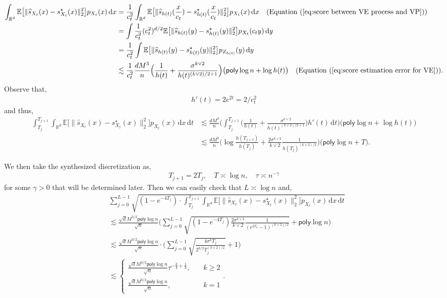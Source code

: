 \documentclass{article}
\newcommand{\diff}{\,\mathrm{d}}
\newcommand{\polylog}{\mathsf{poly}\log}
\theoremstyle{plain}
\theoremstyle{remark}
\begin{document}
\begin{align*}
    \int_{\mathbb{R}^d}\mathbb{E}\big[ \| \widehat{s}_{X_t}(x)-s^\star_{X_t}(x)\|_2^2\big] p_{X_t}(x)\diff x &= \frac{1}{c_t^2}\int_{\mathbb{R}^d}\mathbb{E}\big[ \| \widehat{s}_{h(t)}(\frac{x}{c_t})-s^\star_{h(t)}(\frac{x}{c_t})\|_2^2\big] p_{X_t}(x)\diff x \quad (\text{Equation (\ref{eq:score between VE process and VP})})\\ 
    &= \int \frac{1}{c_t^2}(c_t^2)^{d/2}\mathbb{E} \big[\| \widehat{s}_{h(t)}(y)-s^\star_{h(t)}(y)\|_2^2\big] p_{X_t}(c_t y)\diff y \\
    &= \frac{1}{c_t^2} \int \mathbb{E} \big[\| \widehat{s}_{h(t)}(y)-s^\star_{h(t)}(y)\|_2^2\big] p_{Z_{h(t)}}(y)\diff y \\
    &\lesssim \frac{1}{c_t^2} \frac{dM^3}{n} \Big( \frac{1}{h(t)}+\frac{\sigma^{k\vee2}}{h(t)^{{(k\vee2)}/2+1}}\Big) \big(\polylog n+\log h(t)\big)\quad (\text{Equation (\ref{eq:score estimation error for VE})}).
\end{align*}
Observe that, 
\begin{align*}
    h'(t) = 2e^{2t} = 2/c_t^2
\end{align*}
and thus, 
\begin{align*}
    \int_{T_j}^{T_{j+1}} \int_{\mathbb{R}^d}\mathbb{E}\big[ \| \widehat{s}_{X_t}(x)-s^\star_{X_t}(x)\|_2^2\big] p_{X_t}(x)\diff x \diff t &\lesssim \frac{dM^3}{n}\Big(\int_{T_j}^{T_{j+1}} \Big( \frac{1}{h(t)}+\frac{\sigma^{k\vee2}}{h(t)^{(k\vee2)/2+1}} \Big) h'(t) \diff t\Big) \big(\polylog n+\log h(t)\big)\\
    &\lesssim \frac{dM^3}{n} \Big( \log \frac{h(T_{j+1})}{h(T_j)} + \frac{2\sigma^{k\vee2}}{k\vee2}\frac{1}{h(T_j)^{(k\vee2)/2}} \Big) \big(\polylog n+T\big) .
\end{align*}

We then take the synthesized discretization as, 
\begin{align*}
    T_{j+1} = 2T_j, \quad T \asymp \log n, \quad \tau\asymp n^{-\gamma} 
\end{align*}
for some $\gamma>0$ that will be determined later. Then we can easily check that $L\asymp \log n$ and,
\begin{align*}
    &\sum_{j=0}^{L-1} \sqrt{(1-e^{-4T_j})\cdot \int_{T_j}^{T_{j+1}} \int_{\mathbb{R}^d}\mathbb{E}\big[ \| \widehat{s}_{X_t}(x)-s^\star_{X_t}(x)\|_2^2\big] p_{X_t}(x) \diff x \diff t} \\
    &\lesssim \frac{\sqrt{d}M^{3/2} \polylog n}{\sqrt{n}}  \Big( \sum_{j=0}^{L-1} \sqrt{(1-e^{-4T_j})\frac{2\sigma^{k\vee2}}{k\vee2}\frac{1}{(e^{2T_k}-1)^{(k\vee2)/2}}} + \polylog n\Big)\\
    &\lesssim \frac{\sqrt{d}M^{3/2}\polylog n}{\sqrt{n}} \cdot \Big(\sum_{j=0}^{L-1}\sqrt{\frac{4\sigma^kT_j}{2^{k/2}T_j^{(k\vee2)/2}}} +1 \Big) \\
    &\lesssim 
    \begin{cases}
        \frac{\sqrt{d}M^{3/2}\polylog n}{\sqrt{n}}\tau^{-\frac{k}{4}+\frac{1}{2}}, \quad &k\geq 2 \\
        \frac{\sqrt{d}M^{3/2}\polylog n}{\sqrt{n}}, & k=1
    \end{cases}.
\end{align*}
\end{document}
